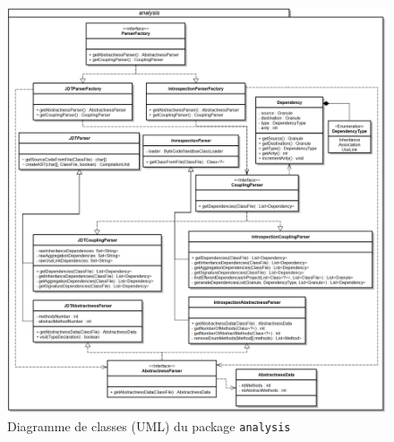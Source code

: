 \documentclass{scrartcl}
\begin{document}
    \begin{figure}[ht!]
        \centering
        \includegraphics[width=\textwidth]{img/uml/analysis.png}
        \caption{Diagramme de classes (UML) du package \texttt{analysis}}
    \end{figure}
\end{document}
